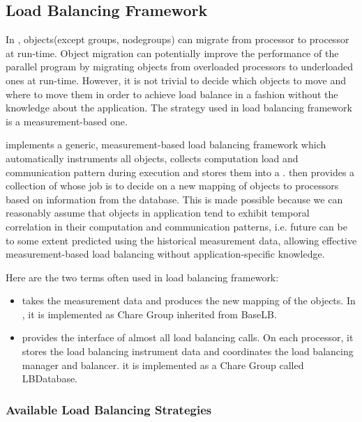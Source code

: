 \subsection{Load Balancing Framework}
\label{lbFramework}

In \charmpp{}, objects(except groups, nodegroups) can migrate from 
processor to processor at run-time. Object migration can potentially 
improve the performance of the parallel program by migrating objects from 
overloaded processors to underloaded ones at run-time. However, it is not
trivial to decide which objects to move and where to move them in 
order to achieve load balance in a fashion without the knowledge about the 
application. The strategy used in  \charmpp{} load balancing framework
is a measurement-based one.

 \charmpp{} implements a generic, measurement-based load balancing framework 
which automatically instruments all \charmpp{} objects, collects computation 
load and communication pattern during execution and stores them into a 
. \charmpp{} then provides a collection of 
 whose job is to decide on a new mapping of 
objects to processors based on information from the database.
This is made possible because we can reasonably assume that objects
in \charmpp{} application tend to exhibit temporal correlation in
their computation and communication patterns, i.e. future can be to some
extent predicted using the historical measurement data, allowing effective
measurement-based load balancing without application-specific knowledge.

Here are the two terms often used in \charmpp{} load balancing framework:
\begin{itemize}
\item {} takes the measurement
   data and produces the new mapping of the objects. In \charmpp{}, it is
   implemented as Chare Group inherited from BaseLB.
\item {} provides the interface of almost all
   load balancing calls. On each processor, it stores the load
   balancing instrument data and coordinates the load balancing manager and
   balancer. it is implemented as a Chare Group called LBDatabase.
\end{itemize}

\subsubsection{Available Load Balancing Strategies}
\label{lbStrategy}

